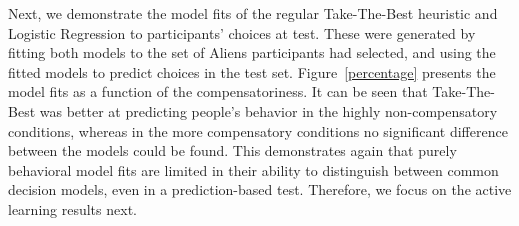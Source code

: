 \documentclass[10pt,letterpaper]{article}
\begin{document}
Next, we demonstrate the model fits of the regular Take-The-Best heuristic and Logistic Regression to participants' choices at test. These were generated by fitting both models to the set of Aliens participants had selected, and using the fitted models to predict choices in the test set. Figure~\ref{percentage} presents the model fits as a function of the compensatoriness.  It can be seen that Take-The-Best was better at predicting people's behavior in the highly non-compensatory conditions,  whereas in the more compensatory conditions no significant difference between the models could be found. This demonstrates again that purely behavioral model fits are limited in their ability to distinguish between common decision models, even in a prediction-based test. Therefore, we focus on the active learning results next.\\
\end{document}
